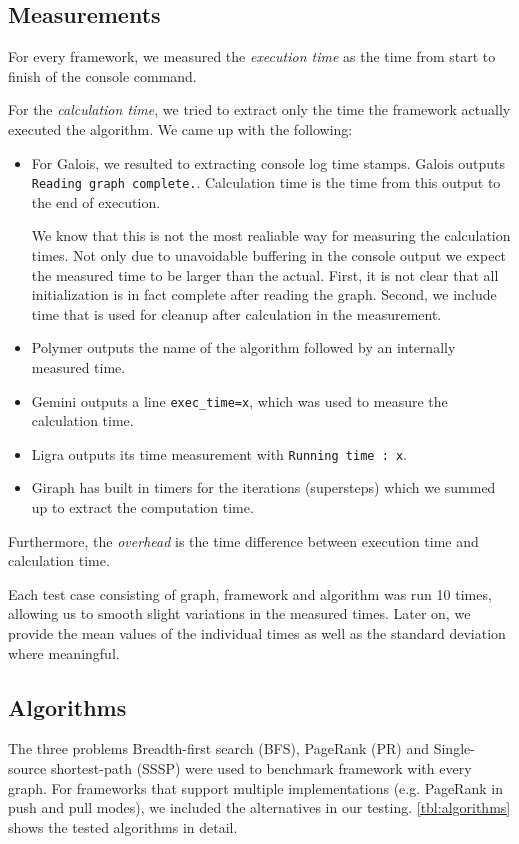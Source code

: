 \subsection{Measurements}
For every framework, we measured the \emph{execution time} as the time from start to finish of the console command.

For the \emph{calculation time}, we tried to extract only the time the framework actually executed the algorithm. We came up with the following:
\begin{itemize}
	\item For Galois, we resulted to extracting console log time stamps. Galois outputs \texttt{Reading graph complete.}. Calculation time is the time from this output to the end of execution.

	We know that this is not the most realiable way for measuring the calculation times. 
	Not only due to unavoidable buffering in the console output we expect the measured time to be larger than the actual.
	First, it is not clear that all initialization is in fact complete after reading the graph. Second, we include time that is used for cleanup after calculation in the measurement.

	\item Polymer outputs the name of the algorithm followed by an internally measured time.

	\item Gemini outputs a line \texttt{exec\_time=x}, which was used to measure the calculation time.

	\item Ligra outputs its time measurement with \texttt{Running time : x}.

	\item Giraph has built in timers for the iterations (supersteps) which we summed up to extract the computation time.
\end{itemize}
Furthermore, the \emph{overhead} is the time difference between execution time and calculation time.

Each test case consisting of graph, framework and algorithm was run 10 times, allowing us to smooth slight variations in the measured times.
Later on, we provide the mean values of the individual times as well as the standard deviation where meaningful.



\subsection{Algorithms}
The three problems Breadth-first search (BFS), PageRank (PR) and Single-source shortest-path (SSSP) were used to benchmark framework with every graph.
For frameworks that support multiple implementations (e.g. PageRank in push and pull modes), we included the alternatives in our testing. 
\autoref{tbl:algorithms} shows the tested algorithms in detail.

